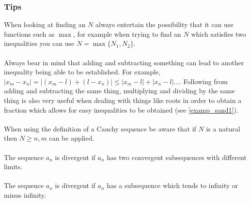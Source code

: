 \documentclass[10pt, a4paper]{article}
\begin{document}
\subsubsection{Tips}
When looking at finding an $N$ always entertain the possibility that it can use functions such as $\max$, for example when trying to find an $N$ which satisfies two inequalities you can use $N = \max{\{N_1, N_2\}}$. \\
\\
Always bear in mind that adding and subtracting something can lead to another inequality being able to be established. For example, $|x_m - x_n| = |(x_m - l) + (l - x_n)| \leq |x_m - l| + |x_n - l|\dotsc$. Following from adding and subtracting the same thing, multiplying and dividing by the same thing is also very useful when dealing with things like roots in order to obtain a fraction which allows for easy inequalities to be obtained (see \autoref{examp_sand1}). \\
\\
When using the definition of a Cauchy sequence be aware that if $N$ is a natural then $N \geq n, m$ can be applied. \\
\\
The sequence $a_n$ is divergent if $a_n$ has two convergent subsequences with different limits. \\
\\
The sequence $a_n$ is divergent if $a_n$ has a subsequence which tends to infinity or minus infinity.
\end{document}
